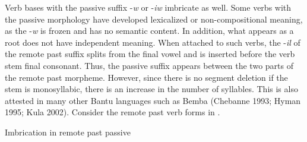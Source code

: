 \documentclass[output=paper]{langsci/langscibook}
\begin{document}
\begin{styleBodyTextIndent}
Verb bases with the passive suffix -\emph{w} or -\emph{iw }imbricate as well. Some verbs with the passive morphology have developed lexicalized or non-compositional meaning, as the -\emph{w} is frozen and has no semantic content. In addition, what appears as a root does not have independent meaning. When attached to such verbs, the -\emph{il} of the remote past suffix splits from the final vowel and is inserted before the verb stem final consonant. Thus, the passive suffix appears between the two parts of the remote past morpheme. However, since there is no segment deletion if the stem is monosyllabic, there is an increase in the number of syllables. This is also attested in many other Bantu languages such as Bemba (Chebanne 1993; Hyman 1995; Kula 2002). Consider the remote past verb forms in .
\end{styleBodyTextIndent}

\begin{stylelsTableHeading}%
\begin{table}
\caption{Imbrication in remote past passive}
\label{tab:25}
\end{table}\end{stylelsTableHeading}
\end{document}
